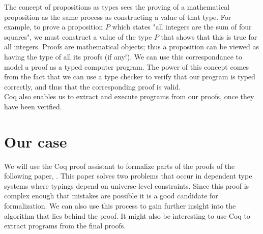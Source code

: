 \documentclass[a4paper,12pt]{article}
\begin{document}
The concept of propositions as types sees the proving of a mathematical proposition
as the same process as constructing a value of that type.
For example, to prove a proposition $P$ which states "all integers are the sum of four squares",
we must construct a value of the type $P$ that shows that this is true for all integers.
Proofs are mathematical objects; thus a proposition can be viewed as having the type of all its proofs (if any!).
We can use this correspondance to model a proof as a typed computer program.
The power of this concept comes from the fact that we can use a type checker to verify that
our program is typed correctly, and thus that the corresponding proof is valid.
\\

Coq also enables us to extract and execute programs from our proofs, once they have been verified.

\section{Our case}

We will use the Coq proof assistant to formalize parts of the proofs of the following paper, \citeauthor{mbezem} \cite{mbezem}.
This paper solves two problems that occur in dependent type systems where typings depend
on universe-level constraints. Since this proof is complex enough that mistakes are possible
it is a good candidate for formalization. We can also use this process to gain further insight
into the algorithm that lies behind the proof. It might also be interesting to use Coq to
extract programs from the final proofs.

\newpage
\printbibliography
\end{document}
